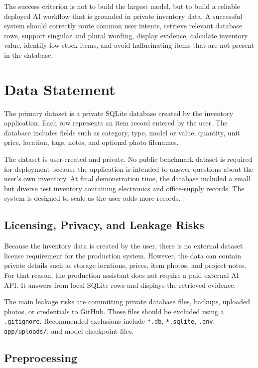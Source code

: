 \documentclass[11pt]{article}
\begin{document}
The success criterion is not to build the largest model, but to build a reliable deployed AI workflow that is grounded in private inventory data. A successful system should correctly route common user intents, retrieve relevant database rows, support singular and plural wording, display evidence, calculate inventory value, identify low-stock items, and avoid hallucinating items that are not present in the database.

\section{Data Statement}

The primary dataset is a private SQLite database created by the inventory application. Each row represents an item record entered by the user. The database includes fields such as category, type, model or value, quantity, unit price, location, tags, notes, and optional photo filenames.

The dataset is user-created and private. No public benchmark dataset is required for deployment because the application is intended to answer questions about the user's own inventory. At final demonstration time, the database included a small but diverse test inventory containing electronics and office-supply records. The system is designed to scale as the user adds more records.

\subsection{Licensing, Privacy, and Leakage Risks}

Because the inventory data is created by the user, there is no external dataset license requirement for the production system. However, the data can contain private details such as storage locations, prices, item photos, and project notes. For that reason, the production assistant does not require a paid external AI API. It answers from local SQLite rows and displays the retrieved evidence.

The main leakage risks are committing private database files, backups, uploaded photos, or credentials to GitHub. These files should be excluded using a \texttt{.gitignore}. Recommended exclusions include \texttt{*.db}, \texttt{*.sqlite}, \texttt{.env}, \texttt{app/uploads/}, and model checkpoint files.

\subsection{Preprocessing}
\end{document}
